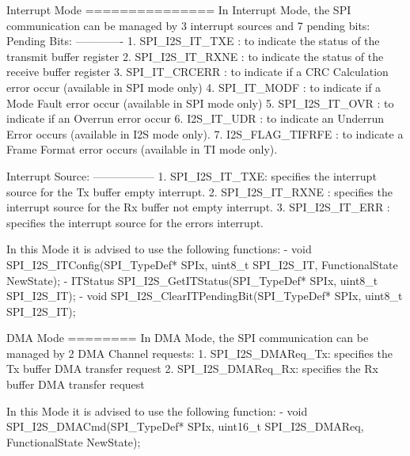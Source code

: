 \begin{DoxyVerb}
  Interrupt Mode
  ===============
  In Interrupt Mode, the SPI communication can be managed by 3 interrupt sources
  and 7 pending bits: 
  Pending Bits:
  ------------- 
     1. SPI_I2S_IT_TXE : to indicate the status of the transmit buffer register
     2. SPI_I2S_IT_RXNE : to indicate the status of the receive buffer register
     3. SPI_IT_CRCERR : to indicate if a CRC Calculation error occur (available in SPI mode only)            
     4. SPI_IT_MODF : to indicate if a Mode Fault error occur (available in SPI mode only)
     5. SPI_I2S_IT_OVR : to indicate if an Overrun error occur
     6. I2S_IT_UDR : to indicate an Underrun Error occurs (available in I2S mode only).
     7. I2S_FLAG_TIFRFE : to indicate a Frame Format error occurs (available in TI mode only).

  Interrupt Source:
  -----------------
     1. SPI_I2S_IT_TXE: specifies the interrupt source for the Tx buffer empty 
                        interrupt.  
     2. SPI_I2S_IT_RXNE : specifies the interrupt source for the Rx buffer not 
                          empty interrupt.
     3. SPI_I2S_IT_ERR : specifies the interrupt source for the errors interrupt.

  In this Mode it is advised to use the following functions:
     - void SPI_I2S_ITConfig(SPI_TypeDef* SPIx, uint8_t SPI_I2S_IT, FunctionalState NewState);
     - ITStatus SPI_I2S_GetITStatus(SPI_TypeDef* SPIx, uint8_t SPI_I2S_IT);
     - void SPI_I2S_ClearITPendingBit(SPI_TypeDef* SPIx, uint8_t SPI_I2S_IT);

  DMA Mode
  ========
  In DMA Mode, the SPI communication can be managed by 2 DMA Channel requests:
     1. SPI_I2S_DMAReq_Tx: specifies the Tx buffer DMA transfer request
     2. SPI_I2S_DMAReq_Rx: specifies the Rx buffer DMA transfer request

  In this Mode it is advised to use the following function:
    - void SPI_I2S_DMACmd(SPI_TypeDef* SPIx, uint16_t SPI_I2S_DMAReq, FunctionalState NewState);\end{DoxyVerb}
 

